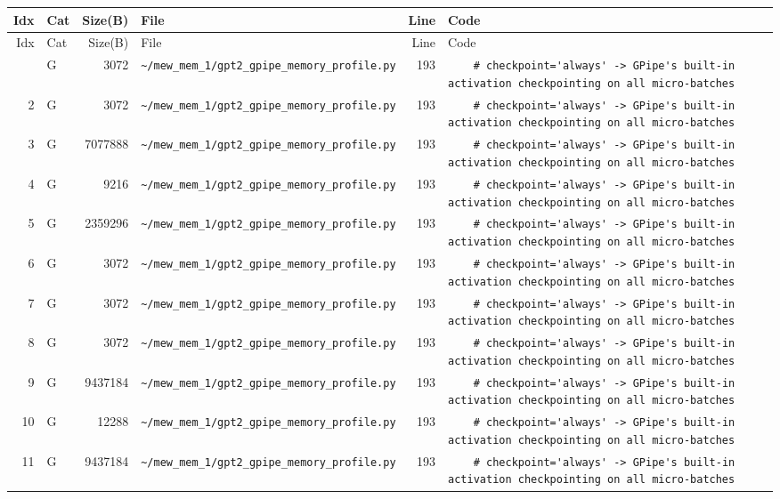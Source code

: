 \documentclass{article}
\begin{document}
\begin{longtable}{r l r p{6.5cm} r p{7.0cm}}
\hline
Idx & Cat & Size(B) & File & Line & Code \\
\hline
\endfirsthead
\hline
Idx & Cat & Size(B) & File & Line & Code \\
\hline
\endhead
\hline
\endfoot
1 & G & 3072 & \lstinline|~/mew_mem_1/gpt2_gpipe_memory_profile.py| & 193 & \lstinline|    # checkpoint='always' -> GPipe's built-in activation checkpointing on all micro-batches| \\
2 & G & 3072 & \lstinline|~/mew_mem_1/gpt2_gpipe_memory_profile.py| & 193 & \lstinline|    # checkpoint='always' -> GPipe's built-in activation checkpointing on all micro-batches| \\
3 & G & 7077888 & \lstinline|~/mew_mem_1/gpt2_gpipe_memory_profile.py| & 193 & \lstinline|    # checkpoint='always' -> GPipe's built-in activation checkpointing on all micro-batches| \\
4 & G & 9216 & \lstinline|~/mew_mem_1/gpt2_gpipe_memory_profile.py| & 193 & \lstinline|    # checkpoint='always' -> GPipe's built-in activation checkpointing on all micro-batches| \\
5 & G & 2359296 & \lstinline|~/mew_mem_1/gpt2_gpipe_memory_profile.py| & 193 & \lstinline|    # checkpoint='always' -> GPipe's built-in activation checkpointing on all micro-batches| \\
6 & G & 3072 & \lstinline|~/mew_mem_1/gpt2_gpipe_memory_profile.py| & 193 & \lstinline|    # checkpoint='always' -> GPipe's built-in activation checkpointing on all micro-batches| \\
7 & G & 3072 & \lstinline|~/mew_mem_1/gpt2_gpipe_memory_profile.py| & 193 & \lstinline|    # checkpoint='always' -> GPipe's built-in activation checkpointing on all micro-batches| \\
8 & G & 3072 & \lstinline|~/mew_mem_1/gpt2_gpipe_memory_profile.py| & 193 & \lstinline|    # checkpoint='always' -> GPipe's built-in activation checkpointing on all micro-batches| \\
9 & G & 9437184 & \lstinline|~/mew_mem_1/gpt2_gpipe_memory_profile.py| & 193 & \lstinline|    # checkpoint='always' -> GPipe's built-in activation checkpointing on all micro-batches| \\
10 & G & 12288 & \lstinline|~/mew_mem_1/gpt2_gpipe_memory_profile.py| & 193 & \lstinline|    # checkpoint='always' -> GPipe's built-in activation checkpointing on all micro-batches| \\
11 & G & 9437184 & \lstinline|~/mew_mem_1/gpt2_gpipe_memory_profile.py| & 193 & \lstinline|    # checkpoint='always' -> GPipe's built-in activation checkpointing on all micro-batches| \\

\end{longtable}
\end{document}
